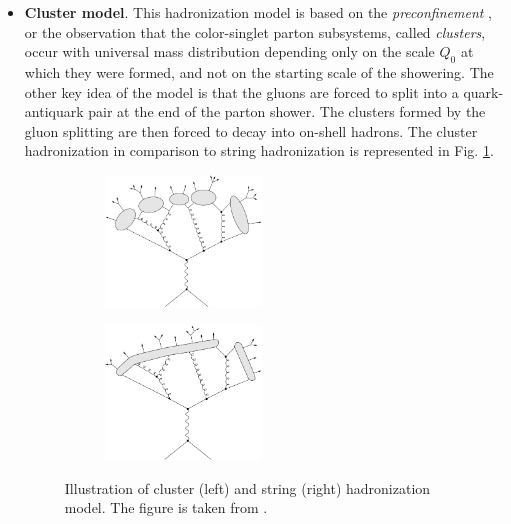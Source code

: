 \begin{itemize}
 \item \textbf{Cluster model}. This hadronization model is based on the \textit{preconfinement} \cite{Amati:1979fg}, or the
 observation that the color-singlet parton subsystems, called \textit{clusters}, occur with universal mass distribution
 depending only on the scale $Q_{0}$ at which they were formed, and not on the starting scale of the showering.
 The other key idea of the model is that the gluons are forced to split into a quark-antiquark pair at the end of the parton shower.
 The clusters formed by the gluon splitting are then forced to decay into on-shell hadrons. The cluster hadronization in comparison
 to string hadronization is represented in Fig. \ref{fig:clustHad}.
 
 \begin{figure}[h]
  \centering
  \begin{subfigure}
   \centering
   \includegraphics[width=0.49\textwidth]{03_simulation/plots/Figures_MonteCarlo_clustr_had.png}
  \end{subfigure}
  \begin{subfigure}
   \centering
   \includegraphics[width=0.49\textwidth]{03_simulation/plots/Figures_MonteCarlo_string_had.png}
  \end{subfigure}
  \caption{Illustration of cluster (left) and string (right) hadronization model. The figure is taken from \cite{Webber:1999ui}.}
  \label{fig:clustHad}
 \end{figure} 
 
\end{itemize}

